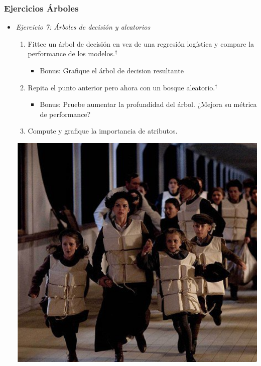 \documentclass[leqno, 10pt, envcountsect]{beamer}
\numberwithin{equation}{section}
\theoremstyle{definition}
\theoremstyle{example}
\numberwithin{figure}{section}
\numberwithin{table}{section}
\let\olditem\item
\renewcommand{\item}{%
\olditem\vspace{1pt}}
\begin{document}
\begin{frame}[fragile=singleslide]
  \frametitle{Ejercicios Árboles}
  \begin{itemize}
    \item \textit{Ejercicio 7: Árboles de decisión y aleatorios}
      \begin{enumerate}
        \item Fittee un árbol de decisión en vez de una regresión logística y
          compare la performance de los modelos.$^{\dag}$
          \begin{itemize}
            \item Bonus: Grafique el árbol de decision resultante
          \end{itemize}
        \item Repita el punto anterior pero ahora con un bosque
          aleatorio.$^{\dag}$
          \begin{itemize}
            \item Bonus: Pruebe aumentar la profundidad del árbol. ¿Mejora su métrica de
                    performance?
          \end{itemize}
        \item Compute y grafique la importancia de atributos.
      \end{enumerate}
      \begin{center}
        \includegraphics[scale=0.18]{run.png}
      \end{center}
  \end{itemize}

\end{frame}
\end{document}
